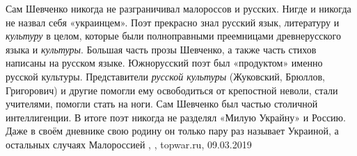 Сам Шевченко никогда не разграничивал малороссов и русских. Нигде и никогда не
назвал себя «украинцем». Поэт прекрасно знал русский язык, литературу и
\emph{культуру} в целом, которые были полноправными преемницами древнерусского языка и
\emph{культуры}. Большая часть прозы Шевченко, а также часть стихов написаны на
русском языке. Южнорусский поэт был «продуктом» именно русской культуры.
Представители \emph{русской культуры} (Жуковский, Брюллов, Григорович) и другие
помогли ему освободиться от крепостной неволи, стали учителями, помогли стать
на ноги. Сам Шевченко был частью столичной интеллигенции. В итоге поэт никогда
не разделял «Милую Украйну» и Россию. Даже в своём дневнике свою родину он
только пару раз называет Украиной, а остальных случаях Малороссией
, , topwar.ru, 09.03.2019
